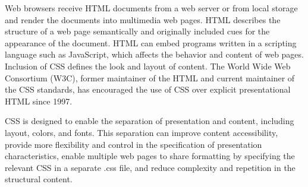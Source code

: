 \documentclass[12pt,a4paper]{report}
\begin{document}
Web browsers receive HTML documents from a web server or from local storage and render the documents into multimedia web pages. HTML describes the structure of a web page semantically and originally included cues for the appearance of the document. HTML can embed programs written in a scripting language such as JavaScript, which affects the behavior and content of web pages. Inclusion of CSS defines the look and layout of content. The World Wide Web Consortium (W3C), former maintainer of the HTML and current maintainer of the CSS standards, has encouraged the use of CSS over explicit presentational HTML since 1997.

CSS is designed to enable the separation of presentation and content, including layout, colors, and fonts. This separation can improve content accessibility, provide more flexibility and control in the specification of presentation characteristics, enable multiple web pages to share formatting by specifying the relevant CSS in a separate .css file, and reduce complexity and repetition in the structural content.
\end{document}
